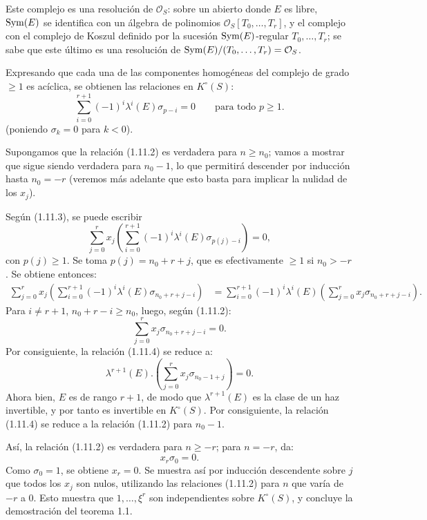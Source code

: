Este complejo es una resolución de \(\mathcal O_S\): sobre un abierto donde \(E\) es libre, \(\operatorname{Sym}(E)\) se identifica con un álgebra de polinomios \(\mathcal O_S[T_0,\ldots,T_r]\), y el complejo con el complejo de Koszul definido por la sucesión \(\operatorname{Sym}(E)\)-regular \(T_0,\ldots,T_r\); se sabe que este último es una resolución de \(\operatorname{Sym}(E)/(T_0,\ldots,T_r)=\mathcal O_S\).

Expresando que cada una de las componentes homogéneas del complejo de grado \(\geq1\) es acíclica, se obtienen las relaciones en \(K^\circ(S)\):
\begin{equation}\tag{1.11.3}
  \sum_{i=0}^{r+1}(-1)^i\lambda^i(E)\sigma_{p-i}=0
  \qquad\text{para todo }p\geq1.
\end{equation}
(poniendo \(\sigma_k=0\) para \(k<0\)).

Supongamos que la relación (1.11.2) es verdadera para \(n\geq n_0\); vamos a mostrar que sigue siendo verdadera para \(n_0-1\), lo que permitirá descender por inducción hasta \(n_0=-r\) (veremos más adelante que esto basta para implicar la nulidad de los \(x_j\)).

Según (1.11.3), se puede escribir
\begin{equation}\tag{1.11.4}
  \sum_{j=0}^r x_j\left(\sum_{i=0}^{r+1}(-1)^i\lambda^i(E)\sigma_{p(j)-i}\right)=0,
\end{equation}
con \(p(j)\geq1\). Se toma \(p(j)=n_0+r+j\), que es efectivamente \(\geq1\) si \(n_0>-r\). Se obtiene entonces:
\[
\begin{aligned}
\sum_{j=0}^r x_j\left(\sum_{i=0}^{r+1}(-1)^i\lambda^i(E)\sigma_{n_0+r+j-i}\right)
&=\sum_{i=0}^{r+1}(-1)^i\lambda^i(E)
   \left(\sum_{j=0}^r x_j\sigma_{n_0+r+j-i}\right).
\end{aligned}
\]
Para \(i\neq r+1\), \(n_0+r-i\geq n_0\), luego, según (1.11.2):
\[
  \sum_{j=0}^r x_j\sigma_{n_0+r+j-i}=0.
\]
Por consiguiente, la relación (1.11.4) se reduce a:
\[
  \lambda^{r+1}(E).\left(\sum_{j=0}^r x_j\sigma_{n_0-1+j}\right)=0.
\]
Ahora bien, \(E\) es de rango \(r+1\), de modo que \(\lambda^{r+1}(E)\) es la clase de un haz invertible, y por tanto es invertible en \(K^\circ(S)\). Por consiguiente, la relación (1.11.4) se reduce a la relación (1.11.2) para \(n_0-1\).

Así, la relación (1.11.2) es verdadera para \(n\geq-r\); para \(n=-r\), da:
\[
  x_r\sigma_0=0.
\]
Como \(\sigma_0=1\), se obtiene \(x_r=0\). Se muestra así por inducción descendente sobre \(j\) que todos los \(x_j\) son nulos, utilizando las relaciones (1.11.2) para \(n\) que varía de \(-r\) a \(0\). Esto muestra que \(1,\ldots,\xi^r\) son independientes sobre \(K^\circ(S)\), y concluye la demostración del teorema 1.1.

